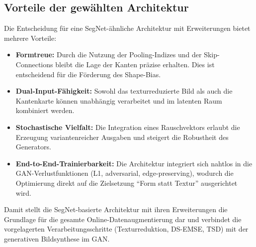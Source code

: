 {\subsection{Vorteile der gewählten Architektur}
Die Entscheidung für eine SegNet-ähnliche Architektur mit Erweiterungen bietet mehrere Vorteile:
\begin{itemize}
    \item \textbf{Formtreue:} Durch die Nutzung der Pooling-Indizes und der Skip-Connections bleibt die Lage der Kanten präzise erhalten. Dies ist entscheidend für die Förderung des Shape-Bias.
    \item \textbf{Dual-Input-Fähigkeit:} Sowohl das texturreduzierte Bild als auch die Kantenkarte können unabhängig verarbeitet und im latenten Raum kombiniert werden.
    \item \textbf{Stochastische Vielfalt:} Die Integration eines Rauschvektors erlaubt die Erzeugung variantenreicher Ausgaben und steigert die Robustheit des Generators.
    \item \textbf{End-to-End-Trainierbarkeit:} Die Architektur integriert sich nahtlos in die GAN-Verlustfunktionen (L1, adversarial, edge-preserving), wodurch die Optimierung direkt auf die Zielsetzung \enquote{Form statt Textur} ausgerichtet wird.
\end{itemize}

Damit stellt die SegNet-basierte Architektur mit ihren Erweiterungen die Grundlage für die gesamte Online-Datenaugmentierung dar und verbindet die vorgelagerten Verarbeitungsschritte (Texturreduktion, \ac{DS-EMSE}, \ac{TSD}) mit der generativen Bildsynthese im \ac{GAN}.

\newpage





}
